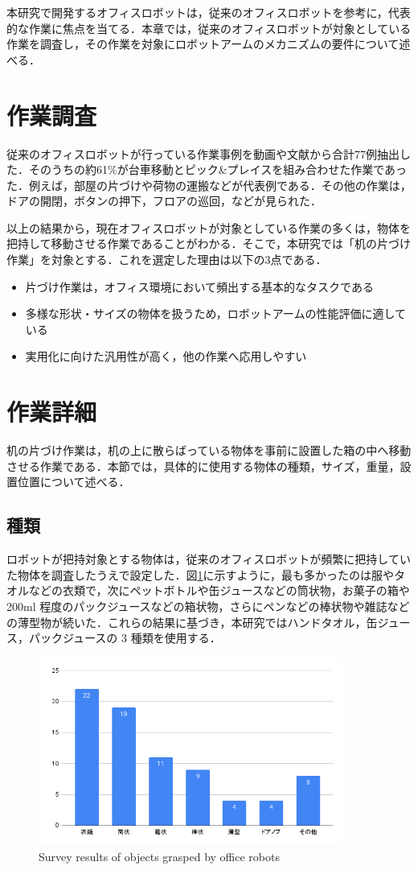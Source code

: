 本研究で開発するオフィスロボットは，従来のオフィスロボットを参考に，代表的な作業に焦点を当てる．本章では，従来のオフィスロボットが対象としている作業を調査し，その作業を対象にロボットアームのメカニズムの要件について述べる．
\section{作業調査}
従来のオフィスロボットが行っている作業事例を動画や文献から合計77例抽出した．そのうちの約61\%が台車移動とピック\&プレイスを組み合わせた作業であった．例えば，部屋の片づけや荷物の運搬などが代表例である．その他の作業は，ドアの開閉，ボタンの押下，フロアの巡回，などが見られた．

以上の結果から，現在オフィスロボットが対象としている作業の多くは，物体を把持して移動させる作業であることがわかる．そこで，本研究では「机の片づけ作業」を対象とする．これを選定した理由は以下の3点である．
\begin{itemize}
  \item 片づけ作業は，オフィス環境において頻出する基本的なタスクである
  \item 多様な形状・サイズの物体を扱うため，ロボットアームの性能評価に適している
  \item 実用化に向けた汎用性が高く，他の作業へ応用しやすい
\end{itemize}

\section{作業詳細}
机の片づけ作業は，机の上に散らばっている物体を事前に設置した箱の中へ移動させる作業である．本節では，具体的に使用する物体の種類，サイズ，重量，設置位置について述べる．
\subsection{種類}
ロボットが把持対象とする物体は，従来のオフィスロボットが頻繁に把持していた物体を調査したうえで設定した．図\ref{fig:handget}に示すように，最も多かったのは服やタオルなどの衣類で，次にペットボトルや缶ジュースなどの筒状物，お菓子の箱や 200ml 程度のパックジュースなどの箱状物，さらにペンなどの棒状物や雑誌などの薄型物が続いた．これらの結果に基づき，本研究ではハンドタオル，缶ジュース，パックジュースの 3 種類を使用する．
\begin{figure}[h]
  \centering
  \includegraphics[width=10cm]{images/2syou/handget.png}
  \caption{Survey results of objects grasped by office robots}
  \label{fig:handget}
\end{figure}
\clearpage
